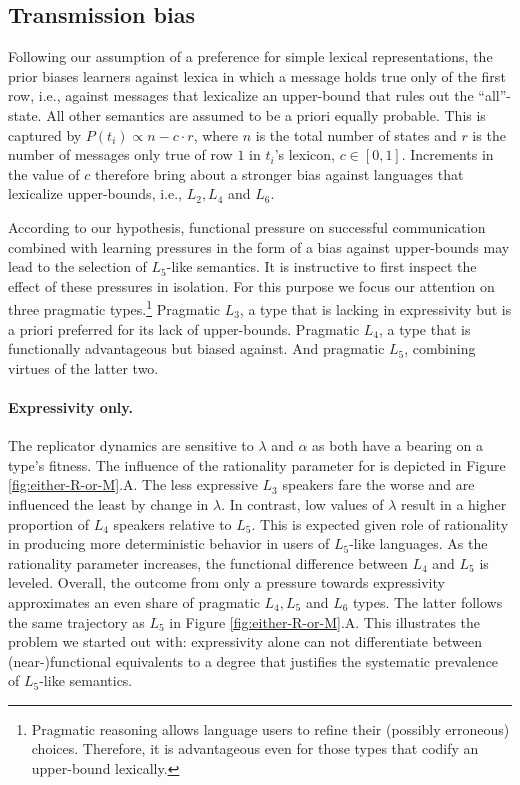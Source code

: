 \documentclass[a4paper]{article}
\begin{document}
\subsection{Transmission bias}\label{subsec:bias}
Following our assumption of a preference for simple lexical representations, the prior biases learners against lexica in which a message holds true only of the first row, i.e., against messages that lexicalize an upper-bound that rules out the ``all''-state. All other semantics are assumed to be a priori equally probable. This is captured by $P(t_i) \propto n - c \cdot r$, where $n$ is the total number of states and $r$ is the number of messages only true of row $1$ in $t_i$'s lexicon, $c \in [0,1]$. Increments in the value of $c$ therefore bring about a stronger bias against languages that lexicalize upper-bounds, i.e., $L_2, L_4$ and $L_6$.

According to our hypothesis, functional pressure on successful communication combined with learning pressures in the form of a bias against upper-bounds may lead to the selection of $L_5$-like semantics. It is instructive to first inspect the effect of these pressures in isolation. For this purpose we focus our attention on three pragmatic types.\footnote{Pragmatic reasoning allows language users to refine their (possibly erroneous) choices. Therefore, it is advantageous even for those types that codify an upper-bound lexically.} Pragmatic $L_3$, a type that is lacking in expressivity but is a priori preferred for its lack of upper-bounds. Pragmatic $L_4$, a type that is functionally advantageous but biased against. And pragmatic $L_5$, combining virtues of the latter two.  

\paragraph{Expressivity only.} The replicator dynamics are sensitive to $\lambda$ and $\alpha$ as both have a bearing on a type's fitness. The influence of the rationality parameter for is depicted in Figure \ref{fig:either-R-or-M}.A. The less expressive $L_3$ speakers fare the worse and are influenced the least by change in $\lambda$. In contrast, low values of $\lambda$ result in a higher proportion of $L_4$ speakers relative to $L_5$. This is expected given role of rationality in producing more deterministic behavior in users of $L_5$-like languages. As the rationality parameter increases, the functional difference between $L_4$ and $L_5$ is leveled. Overall, the outcome from only a pressure towards expressivity approximates an even share of pragmatic $L_4, L_5$ and $L_6$ types. The latter follows the same trajectory as $L_5$ in Figure \ref{fig:either-R-or-M}.A.  This illustrates the problem we started out with: expressivity alone can not differentiate between (near-)functional equivalents to a degree that justifies the systematic prevalence of $L_5$-like semantics.  
\end{document}
